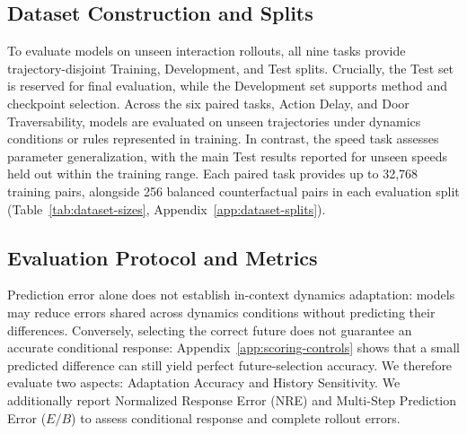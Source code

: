 \subsection{Dataset Construction and Splits}
\label{sec:data}

To evaluate models on unseen interaction rollouts, all nine tasks provide trajectory-disjoint Training, Development, and Test splits. Crucially, the Test set is reserved for final evaluation, while the Development set supports method and checkpoint selection. Across the six paired tasks, Action Delay, and Door Traversability, models are evaluated on unseen trajectories under dynamics conditions or rules represented in training. In contrast, the speed task assesses parameter generalization, with the main Test results reported for unseen speeds held out within the training range. Each paired task provides up to 32,768 training pairs, alongside 256 balanced counterfactual pairs in each evaluation split (Table~\ref{tab:dataset-sizes}, Appendix~\ref{app:dataset-splits}).

\subsection{Evaluation Protocol and Metrics}
\label{sec:evaluation}

Prediction error alone does not establish in-context dynamics adaptation: models may reduce errors shared across dynamics conditions without predicting their differences.
Conversely, selecting the correct future does not guarantee an accurate conditional response: Appendix~\ref{app:scoring-controls} shows that a small predicted difference can still yield perfect future-selection accuracy.
We therefore evaluate two aspects: Adaptation Accuracy and History Sensitivity.
We additionally report Normalized Response Error (NRE) and Multi-Step Prediction Error ($E/B$) to assess conditional response and complete rollout errors.

